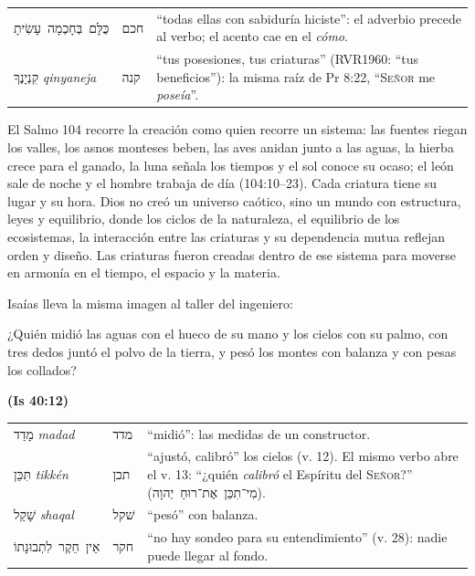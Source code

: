 \documentclass[11pt,letterpaper]{article}
\newcommand{\heb}[1]{\mbox{\foreignlanguage{hebrew}{#1}}}
\newcommand{\SENOR}{\textsc{Señor}}
\newcommand{\fuente}[1]{\par\hfill{\upshape\bfseries\small\textcolor{azul}{#1}}}
\begin{document}
\begin{filologia}[Sal 104:24]
\begin{tabular}{@{}L{3.2cm}L{1.6cm}L{10cm}@{}}
\heb{כֻּלָּם בְּחָכְמָה עָשִׂיתָ} & \heb{חכם} & ``todas ellas con sabiduría hiciste'': el adverbio precede al verbo; el acento cae en el \emph{cómo}. \\[2pt]
\heb{קִנְיָנֶךָ} \emph{qinyaneja} & \heb{קנה} & ``tus posesiones, tus criaturas'' (RVR1960: ``tus beneficios''): la misma raíz de Pr 8:22, ``\SENOR{} me \emph{poseía}''. \\
\end{tabular}
\end{filologia}

El Salmo 104 recorre la creación como quien recorre un sistema: las fuentes riegan los valles, los asnos monteses beben, las aves anidan junto a las aguas, la hierba crece para el ganado, la luna señala los tiempos y el sol conoce su ocaso; el león sale de noche y el hombre trabaja de día (104:10--23). Cada criatura tiene su lugar y su hora. Dios no creó un universo caótico, sino un mundo con estructura, leyes y equilibrio, donde los ciclos de la naturaleza, el equilibrio de los ecosistemas, la interacción entre las criaturas y su dependencia mutua reflejan orden y diseño. Las criaturas fueron creadas dentro de ese sistema para moverse en armonía en el tiempo, el espacio y la materia.

Isaías lleva la misma imagen al taller del ingeniero:

\begin{cita}¿Quién midió las aguas con el hueco de su mano y los cielos con su palmo, con tres dedos juntó el polvo de la tierra, y pesó los montes con balanza y con pesas los collados?\fuente{(Is 40:12)}\end{cita}

\begin{filologia}[Is 40:12--14, 28]
\begin{tabular}{@{}L{3.2cm}L{1.6cm}L{10cm}@{}}
\heb{מָדַד} \emph{madad} & \heb{מדד} & ``midió'': las medidas de un constructor. \\[2pt]
\heb{תִּכֵּן} \emph{tikkén} & \heb{תכן} & ``ajustó, calibró'' los cielos (v. 12). El mismo verbo abre el v. 13: ``¿quién \emph{calibró} el Espíritu del \SENOR?'' (\heb{מִי־תִכֵּן אֶת־רוּחַ יְהוָה}). \\[2pt]
\heb{שָׁקַל} \emph{shaqal} & \heb{שׁקל} & ``pesó'' con balanza. \\[2pt]
\heb{אֵין חֵקֶר לִתְבוּנָתוֹ} & \heb{חקר} & ``no hay sondeo para su entendimiento'' (v. 28): nadie puede llegar al fondo. \\
\end{tabular}
\end{filologia}
\end{document}
